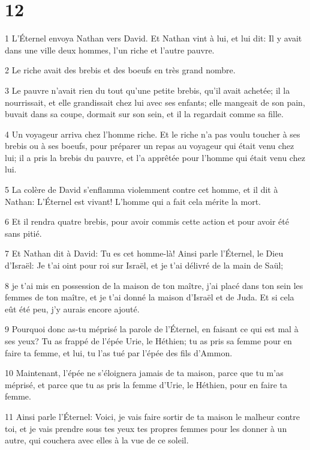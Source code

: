 \chapter{12}

\par 1 L'Éternel envoya Nathan vers David. Et Nathan vint à lui, et lui dit: Il y avait dans une ville deux hommes, l'un riche et l'autre pauvre.
\par 2 Le riche avait des brebis et des boeufs en très grand nombre.
\par 3 Le pauvre n'avait rien du tout qu'une petite brebis, qu'il avait achetée; il la nourrissait, et elle grandissait chez lui avec ses enfants; elle mangeait de son pain, buvait dans sa coupe, dormait sur son sein, et il la regardait comme sa fille.
\par 4 Un voyageur arriva chez l'homme riche. Et le riche n'a pas voulu toucher à ses brebis ou à ses boeufs, pour préparer un repas au voyageur qui était venu chez lui; il a pris la brebis du pauvre, et l'a apprêtée pour l'homme qui était venu chez lui.
\par 5 La colère de David s'enflamma violemment contre cet homme, et il dit à Nathan: L'Éternel est vivant! L'homme qui a fait cela mérite la mort.
\par 6 Et il rendra quatre brebis, pour avoir commis cette action et pour avoir été sans pitié.
\par 7 Et Nathan dit à David: Tu es cet homme-là! Ainsi parle l'Éternel, le Dieu d'Israël: Je t'ai oint pour roi sur Israël, et je t'ai délivré de la main de Saül;
\par 8 je t'ai mis en possession de la maison de ton maître, j'ai placé dans ton sein les femmes de ton maître, et je t'ai donné la maison d'Israël et de Juda. Et si cela eût été peu, j'y aurais encore ajouté.
\par 9 Pourquoi donc as-tu méprisé la parole de l'Éternel, en faisant ce qui est mal à ses yeux? Tu as frappé de l'épée Urie, le Héthien; tu as pris sa femme pour en faire ta femme, et lui, tu l'as tué par l'épée des fils d'Ammon.
\par 10 Maintenant, l'épée ne s'éloignera jamais de ta maison, parce que tu m'as méprisé, et parce que tu as pris la femme d'Urie, le Héthien, pour en faire ta femme.
\par 11 Ainsi parle l'Éternel: Voici, je vais faire sortir de ta maison le malheur contre toi, et je vais prendre sous tes yeux tes propres femmes pour les donner à un autre, qui couchera avec elles à la vue de ce soleil.
